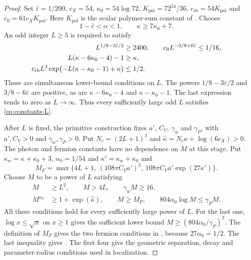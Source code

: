 \begin{proof} Set $\bar\varepsilon=1/200$, $c_X=54$,
$\kappa_0=54\log72$, $K_{\mathrm{pol}}=72^{54}/36$,
$c_{\mathrm{rb}}=54K_{\mathrm{pol}}$ and $c_{\mathrm{fl}}=61c_XK_{\mathrm{pol}}$.
Here $K_{\mathrm{pol}}$ is the scalar polymer-sum constant of
\cite[Appendix~B, (81)]{NormalizedContraction}. Choose
\[
 1-\bar\varepsilon<\alpha<1,\qquad
 \kappa\ge7\kappa_0+7.
\]
An odd integer $L\ge5$ is required to satisfy
\begin{align}
 L^{1/8-3\bar\varepsilon/2}&\ge2400,\qquad
 c_{\mathrm{fl}}L^{-3/8+6\bar\varepsilon}\le1/16,\notag\\
 L(\kappa-6\kappa_0-4)-1&\ge\kappa,\notag\\
 c_{\mathrm{rb}}L^3
       \exp\bigl(-L(\kappa-\kappa_0-1)+\kappa\bigr)
                                                   &\le1/2.
                                      \label{eq:constants-L}
\end{align}
These are simultaneous lower-bound conditions on $L$.
The powers $1/8-3\bar\varepsilon/2$ and
$3/8-6\bar\varepsilon$ are positive, as are
$\kappa-6\kappa_0-4$ and $\kappa-\kappa_0-1$.
The last expression tends to zero as $L\to\infty$.
Thus every sufficiently large odd $L$ satisfies
\eqref{eq:constants-L}.

After $L$ is fixed, the primitive construction fixes
$a'$, $C_V$, $\gamma_w$ and $\gamma_P$, with $a',C_V>0$
and $\gamma_w,\gamma_P>0$. Put
$N_c=(2L+1)^3$ and
$\widehat\kappa=N_c\kappa+\log(6c_X)>0$.
The photon and fermion
constants have no dependence on $M$ at this stage.
Put $\kappa_w=\kappa+\kappa_0+3$, $\alpha_0=1/54$ and $\kappa'=\kappa_w+\kappa_0$ and
\[
 M_F=\max\{4L+1,\ (108\pi C_Va')^2,\
                         108\pi C_Va'\exp(27\kappa')\}.
\]
Choose $M$ to be a power of $L$ satisfying
\begin{equation}\label{eq:constants-M}
 \begin{split}
 M&\ge L^2,\qquad M>4L,\qquad \gamma_wM\ge16,\\
 M^{\alpha_0}&\ge1+\exp(\widehat\kappa),\qquad
 M\ge M_F,\qquad 804\alpha_0\log M\le\gamma_PM.
 \end{split}
\end{equation}
All these conditions hold for every sufficiently large
power of $L$. For the last one, $\log x\le\sqrt x$
on $x\ge1$ gives the sufficient lower bound
$M\ge(804\alpha_0/\gamma_P)^2$.
The definition of $M_F$ gives the two fermion
conditions in ,
because $27\alpha_0=1/2$.
The last inequality gives .
The first four give the geometric separation, decay
and parameter-radius conditions used in localization.


\end{proof}
